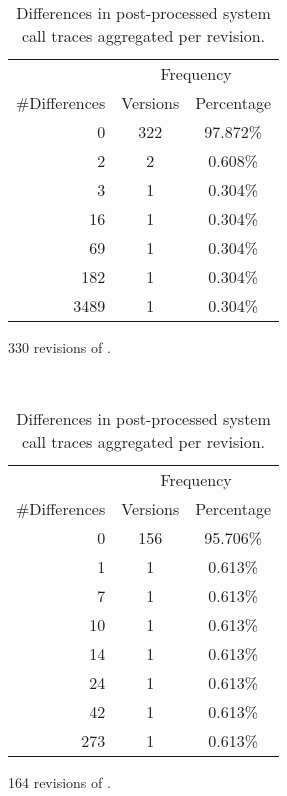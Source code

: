 \begin{table}
  \begin{subtable}[t]{0.5\textwidth}
    \centering
    \begin{tabular}{r @{\qquad}c c}
      \toprule
      & \multicolumn{2}{c}{Frequency} \\
      \cmidrule(r){2-3}
      \#Differences & Versions & Percentage \\
      \midrule
      0 & 322 & 97.872\% \\
      2 & 2 & 0.608\% \\
      3 & 1 & 0.304\% \\
      16 & 1 & 0.304\% \\ 
      69 & 1 & 0.304\% \\
      182 & 1 & 0.304\% \\
      3489 & 1 & 0.304\% \\
      \bottomrule
    \end{tabular}
    \caption{330 revisions of \vim.}
  \end{subtable}
  ~
  \begin{subtable}[t]{0.5\textwidth}
    \centering
    \begin{tabular}{r @{\qquad}c c}
      \toprule
      & \multicolumn{2}{c}{Frequency} \\
      \cmidrule(r){2-3}
      \#Differences & Versions & Percentage \\
      \midrule
      0 & 156 & 95.706\% \\
      1 & 1 & 0.613\% \\
      7 & 1 & 0.613\% \\
      10 & 1 & 0.613\% \\ 
      14 & 1 & 0.613\% \\
      24 & 1 & 0.613\% \\
      42 & 1 & 0.613\% \\
      273 & 1 & 0.613\% \\
      \bottomrule
    \end{tabular}
    \caption{164 revisions of \lighttpd.}
  \end{subtable}
  \caption{Differences in post-processed system call traces aggregated per revision.}
  \label{tab:perversion}
\end{table}

\begin{table}
  \label{tab:perversion}
\end{table}



